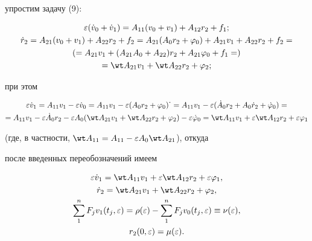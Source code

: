упростим задачу (9): 


\begin{gather*} 


\varepsilon(\Dot v_0+\Dot v_1)=A_{11}(v_0+v_1)+A_{12}r_2+f_1;\\ 


% 


\Dot r_2=A_{21}(v_0+v_1)+A_{22}r_2+f_2= 


A_{21}(A_0r_2+\varphi_0)+A_{21}v_1+A_{22}r_2+f_2= \\ 


% 


(=A_{21}v_1+(A_{21}A_0+A_{22})r_2+A_{21}\varphi_0+f_1=)\\ 


% 


=\wt A_{21}v_1+\wt A_{22}r_2+\varphi_2; 


\end{gather*} 


при этом 


\begin{multline*} 


\varepsilon\Dot v_1=A_{11}v_1-\varepsilon\Dot v_0= 


A_{11}v_1-\varepsilon(A_0r_2+\varphi_0)^{\mydot}= 


A_{11}v_1-\varepsilon(\Dot A_0r_2+A_0\Dot r_2+\Dot\varphi_0)= \\ 


% 


=A_{11}v_1-\varepsilon\Dot A_0r_2-\varepsilon A_0 


(\wt A_{21}v_1+\wt A_{22}r_2+\varphi_2)- 


\varepsilon\Dot \varphi_0=\wt A_{11}v_1+\varepsilon\wt A_{12}r_2 


+\varepsilon\varphi_1 


\end{multline*} 


(где, в частности, $\wt A_{11}=A_{11}-\varepsilon A_0\wt A_{21}$), откуда 


после введенных переобозначений имеем 


\begin{gather*} 


\varepsilon\Dot v_1=\wt A_{11}v_1+\varepsilon\wt A_{12} 


r_2+\varepsilon\varphi_1, \\ 


\Dot r_2=\wt A_{21}v_1+\wt A_{22}r_2+\varphi_2, \\ 


\sum^n_1 F_j v_1(t_j,\varepsilon)=\rho(\varepsilon)- 


\sum^n_1 F_j v_0(t_j,\varepsilon)\equiv\nu(\varepsilon),\\ 


r_2(0,\varepsilon)=\mu(\varepsilon). 


\end{gather*} 


